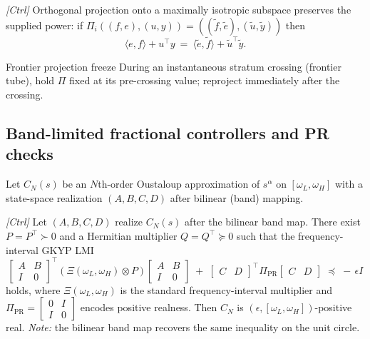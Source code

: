 \begin{lemma}\label{lem:supply}
\emph{[\textup{Ctrl}]} Orthogonal projection onto a maximally isotropic subspace preserves the supplied power: if $\Pi_i((f,e),(u,y))=((\tilde f,\tilde e),(\tilde u,\tilde y))$ then
\[
\langle e,f\rangle + u^\top y \ =\ \langle \tilde e,\tilde f\rangle + \tilde u^\top \tilde y.
\]
\end{lemma}

\begin{rulex}{Frontier projection freeze}\label{rule:frontier-freeze}
During an instantaneous stratum crossing (frontier tube), hold $\Pi$ fixed at its pre-crossing value; reproject immediately after the crossing.
\end{rulex}

\subsection{Band-limited fractional controllers and PR checks}\label{subsec:oust}

Let $C_N(s)$ be an $N$th-order Oustaloup approximation of $s^\alpha$ on $[\omega_L,\omega_H]$ with a state-space realization $(A,B,C,D)$ after bilinear (band) mapping.

\begin{lemma}\label{lem:oust-pr-gkyp}
\emph{[\textup{Ctrl}]}
Let $(A,B,C,D)$ realize $C_N(s)$ after the bilinear band map. There exist $P=P^\top\!\succ0$ and a Hermitian multiplier $Q=Q^\top\succeq0$ such that the frequency-interval GKYP LMI
\[
\begin{bmatrix} A & B \\ I & 0 \end{bmatrix}^{\top}\!\left(\Xi(\omega_L,\omega_H)\otimes P\right)\!\begin{bmatrix} A & B \\ I & 0 \end{bmatrix}
\; +\;
\begin{bmatrix} C & D \end{bmatrix}^{\top} \Pi_{\mathrm{PR}} \begin{bmatrix} C & D \end{bmatrix}
\;\preceq\; -\,\epsilon I
\]
holds, where $\Xi(\omega_L,\omega_H)$ is the standard frequency-interval multiplier and 
$\Pi_{\mathrm{PR}}=\begin{bmatrix}0 & I\\ I & 0\end{bmatrix}$ encodes positive realness.
Then $C_N$ is $(\epsilon,[\omega_L,\omega_H])$-positive real. 
\emph{Note:} the bilinear band map recovers the same inequality on the unit circle.
\end{lemma}

